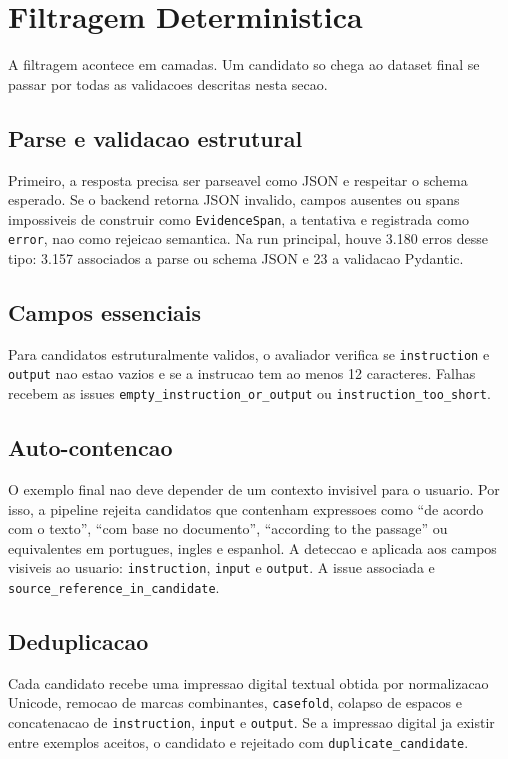\documentclass{article}
\begin{document}
\section{Filtragem Deterministica}

A filtragem acontece em camadas. Um candidato so chega ao dataset final se
passar por todas as validacoes descritas nesta secao.

\subsection{Parse e validacao estrutural}

Primeiro, a resposta precisa ser parseavel como JSON e respeitar o schema
esperado. Se o backend retorna JSON invalido, campos ausentes ou spans
impossiveis de construir como \texttt{EvidenceSpan}, a tentativa e registrada
como \texttt{error}, nao como rejeicao semantica. Na run principal, houve 3.180
erros desse tipo: 3.157 associados a parse ou schema JSON e 23 a validacao
Pydantic.

\subsection{Campos essenciais}

Para candidatos estruturalmente validos, o avaliador verifica se
\texttt{instruction} e \texttt{output} nao estao vazios e se a instrucao tem
ao menos 12 caracteres. Falhas recebem as issues
\texttt{empty\_instruction\_or\_output} ou
\texttt{instruction\_too\_short}.

\subsection{Auto-contencao}

O exemplo final nao deve depender de um contexto invisivel para o usuario. Por
isso, a pipeline rejeita candidatos que contenham expressoes como ``de acordo
com o texto'', ``com base no documento'', ``according to the passage'' ou
equivalentes em portugues, ingles e espanhol. A deteccao e aplicada aos campos
visiveis ao usuario: \texttt{instruction}, \texttt{input} e \texttt{output}.
A issue associada e \texttt{source\_reference\_in\_candidate}.

\subsection{Deduplicacao}

Cada candidato recebe uma impressao digital textual obtida por normalizacao
Unicode, remocao de marcas combinantes, \texttt{casefold}, colapso de espacos
e concatenacao de \texttt{instruction}, \texttt{input} e \texttt{output}. Se a
impressao digital ja existir entre exemplos aceitos, o candidato e rejeitado
com \texttt{duplicate\_candidate}.
\end{document}
